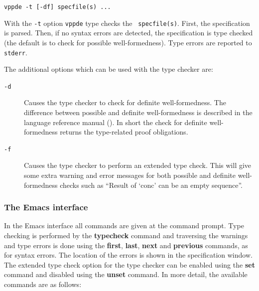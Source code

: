 \documentclass[\pformat,12pt]{article}
\newcommand{\vdmde}{vppde}
\newcommand{\aaa}{\tt }
\begin{document}
{\tt \vdmde\ -t [-df] specfile(s) ...}

\vspace{0.5cm}

\noindent
With the {\tt -t} option {\tt \vdmde} type checks the {\tt
  specfile(s)}.  First, the specification is parsed. Then, if no syntax
errors are detected, the specification is type checked (the default
is to check for possible well-formedness). Type errors are reported to
{\aaa stderr}.

The additional options which can be used with the type checker are:


\begin{description}
\item[{\tt -d}] Causes the type checker to check for definite
  well-formedness.  The difference between possible and definite
  well-formedness is described in the language reference manual
  (). In 
  short the check for definite well-formedness returns the
  type-related proof obligations.
  
\item[{\tt -f}] Causes the type checker to perform an extended type
  check.  This will give some extra warning and error messages for
  both possible and definite well-formedness checks such as ``Result
  of `conc' can be an empty sequence''.

\end{description}

\subsubsection{The Emacs interface}

In the Emacs interface all commands are given at the command prompt.
Type checking is performed by the \textbf{typecheck} command and
traversing the warnings and type errors is done using the
\textbf{first}, \textbf{last}, \textbf{next} and \textbf{previous}
commands, as for syntax errors. The location of the errors is
shown in the specification window. The extended type check option for
the type checker can be enabled using the \textbf{set} command and
disabled using the \textbf{unset} command. In more detail, the
available commands are as follows:
\end{document}
